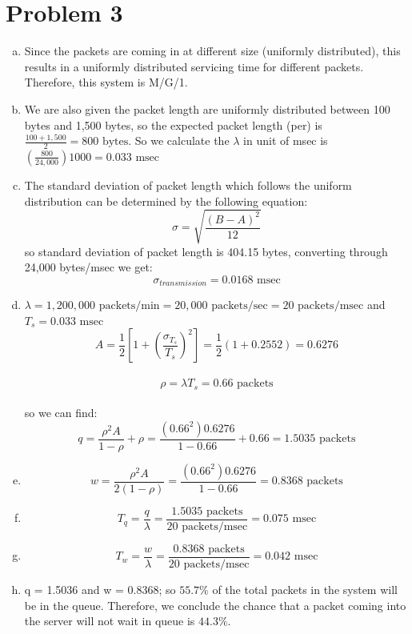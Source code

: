 \documentclass{article}   	                         %
\begin{document}
\section*{Problem 3}
\begin{enumerate}[(a)]
\item
Since the packets are coming in at different size (uniformly distributed), this results in a uniformly distributed servicing time for different packets. Therefore, this system is M/G/1.
\item
We are also given the packet length are uniformly distributed between 100 bytes and 1,500 bytes, so the expected packet length (per) is $\frac{100 + 1,500}{2} = 800 \text {  bytes}$.  So we calculate the $\lambda$ in unit of msec is $\left(\frac{800}{24,000}\right) 1000 = 0.033 \text{   msec}$
\item
The standard deviation of packet length which follows the uniform distribution can be determined by the following equation:\\
\begin{equation} \sigma = \sqrt{\frac{(B - A)^{2}} {12}}\end{equation}
so standard deviation of packet length is 404.15 bytes, converting through 24,000 bytes/msec we get:\\
\begin{equation} \sigma_{transmission} = 0.0168 \text {   msec}\end{equation}
\item
$\lambda = 1,200,000 \text {   packets/min} = 20,000 \text {   packets/sec} = 20 \text {   packets/msec}$ and $T_s = 0.033 \text{   msec}$\\
$$A = \frac{1}{2}\left[1 + \left(\frac{\sigma_{T_s}}{T_s}\right)^2\right] = \frac{1}{2}(1 + 0.2552) = 0.6276$$\\
$$\rho = \lambda T_s = 0.66 \text {   packets}$$\\
so we can find: \\
$$q = \frac{\rho^2A}{1-\rho} + \rho =  \frac{(0.66^2)0.6276}{1-0.66} + 0.66 = 1.5035 \text {   packets}$$
\item
$$w = \frac{\rho^2A}{2(1-\rho)} = \frac{(0.66^2)0.6276}{1-0.66} = 0.8368 \text {   packets}$$
\item
$$T_q =  \frac{q}{\lambda} = \frac{1.5035 \text {   packets}}{20 \text {   packets/msec}} = 0.075 \text{   msec}$$
\item
$$T_w = \frac{w}{\lambda} = \frac{0.8368 \text {   packets}}{20 \text {   packets/msec}} = 0.042 \text{   msec}$$
\item
q = 1.5036 and w = 0.8368; so $55.7\%$ of the total packets in the system will be in the queue. Therefore, we conclude the chance that a packet coming into the server will not wait in queue is $44.3\%$.\\
\end{enumerate}
\end{document}
